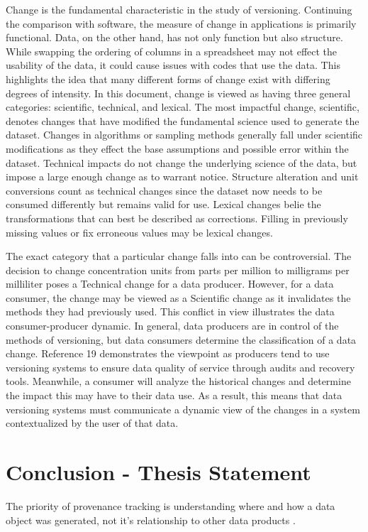 Change is the fundamental characteristic in the study of versioning.
Continuing the comparison with software, the measure of change in applications is primarily functional.
Data, on the other hand, has not only function but also structure.
While swapping the ordering of columns in a spreadsheet may not effect the usability of the data, it could cause issues with codes that use the data.
This highlights the idea that many different forms of change exist with differing degrees of intensity.
In this document, change is viewed as having three general categories: scientific, technical, and lexical.
The most impactful change, scientific, denotes changes that have modified the fundamental science used to generate the dataset.
Changes in algorithms or sampling methods generally fall under scientific modifications as they effect the base assumptions and possible error within the dataset.
Technical impacts do not change the underlying science of the data, but impose a large enough change as to warrant notice.
Structure alteration and unit conversions count as technical changes since the dataset now needs to be consumed differently but remains valid for use.
Lexical changes belie the transformations that can best be described as corrections.
Filling in previously missing values or fix erroneous values may be lexical changes.

The exact category that a particular change falls into can be controversial.
The decision to change concentration units from parts per million to milligrams per milliliter poses a Technical change for a data producer.
However, for a data consumer, the change may be viewed as a Scientific change as it invalidates the methods they had previously used.
This conflict in view illustrates the data consumer-producer dynamic.
In general, data producers are in control of the methods of versioning, but data consumers determine the classification of a data change.
Reference 19 demonstrates the viewpoint as producers tend to use versioning systems to ensure data quality of service through audits and recovery tools.
Meanwhile, a consumer will analyze the historical changes and determine the impact this may have to their data use.
As a result, this means that data versioning systems must communicate a dynamic view of the changes in a system contextualized by the user of that data.

\section{Conclusion - Thesis Statement}
The priority of provenance tracking is understanding where and how a data object was generated, not it's relationship to other data products \cite{Bose:2005:LRS:1057977.1057978}.

